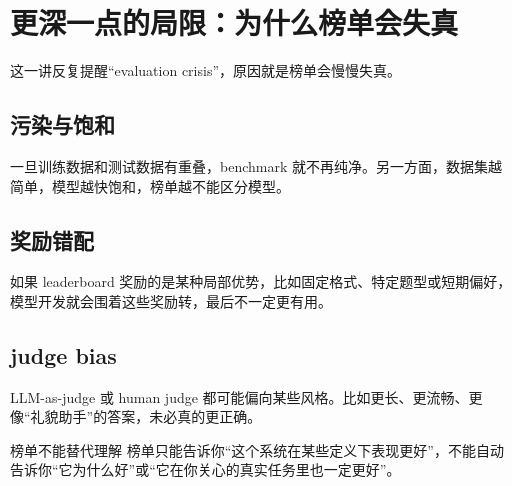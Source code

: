 \section{更深一点的局限：为什么榜单会失真}

这一讲反复提醒“evaluation crisis”，原因就是榜单会慢慢失真。

\subsection{污染与饱和}

一旦训练数据和测试数据有重叠，benchmark 就不再纯净。另一方面，数据集越简单，模型越快饱和，榜单越不能区分模型。

\subsection{奖励错配}

如果 leaderboard 奖励的是某种局部优势，比如固定格式、特定题型或短期偏好，模型开发就会围着这些奖励转，最后不一定更有用。

\subsection{judge bias}

LLM-as-judge 或 human judge 都可能偏向某些风格。比如更长、更流畅、更像“礼貌助手”的答案，未必真的更正确。

\begin{warningbox}{榜单不能替代理解}
榜单只能告诉你“这个系统在某些定义下表现更好”，不能自动告诉你“它为什么好”或“它在你关心的真实任务里也一定更好”。
\end{warningbox}

